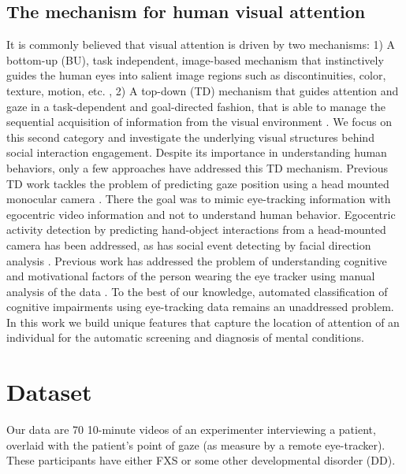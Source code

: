 \documentclass[10pt,twocolumn,letterpaper]{article}
\begin{document}
\subsection{The mechanism for human visual attention} It is commonly believed that visual attention is driven by two mechanisms: 1) A bottom-up (BU), task independent, image-based mechanism that instinctively guides the human eyes into salient image regions such as discontinuities, color, texture, motion, etc. \cite{AmodelofsaliencybasedvisualattentionforrapidsceneanalysisItti:tq}, 2) A top-down (TD)  mechanism that guides attention and gaze in a task-dependent and goal-directed fashion, that is able to manage the sequential acquisition of information from the visual environment \cite{HANDEYE, Borji:2012dq}. We focus on this second category and investigate the underlying visual structures behind social interaction engagement. Despite its importance in understanding human behaviors, only a few approaches have addressed this TD mechanism. Previous TD work tackles the problem of predicting gaze position using a head mounted monocular camera \cite{Fathi:2012vk, stiefelhagen2002modeling}. There the goal was to mimic eye-tracking information with egocentric video information and not to understand human behavior. Egocentric activity detection by predicting hand-object interactions from a head-mounted camera \cite{Fathi:2013tc} has been addressed, as has social event detecting by facial direction analysis \cite{FromEgotoNosVisionDetectingSocialRelationshipsinFirstPersonViewsAlletto:wi}. Previous work has addressed the problem of understanding cognitive and motivational factors of the person wearing the eye tracker using manual analysis of the data \cite{linda}. To the best of our knowledge, automated classification of cognitive impairments using eye-tracking data remains an unaddressed problem.  In this work we build unique features that capture the location of attention of an individual for the automatic screening and diagnosis of mental conditions.  
 
\section{Dataset}
\vspace{-0.1cm}
Our data are 70 10-minute videos of an experimenter interviewing a patient, overlaid with the patient's point of gaze (as measure by a remote eye-tracker). These participants have either FXS or some other developmental disorder (DD). 
\end{document}
